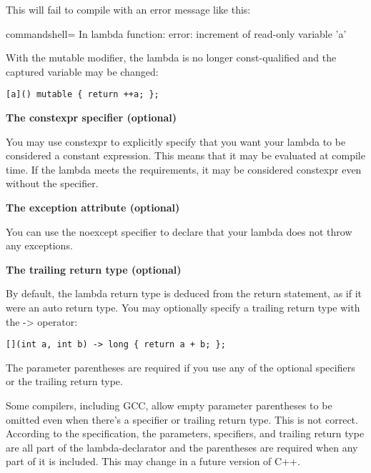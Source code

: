 This will fail to compile with an error message like this:

\begin{tcblisting}{commandshell={}}
In lambda function:
error: increment of read-only variable 'a'
\end{tcblisting}

With the mutable modifier, the lambda is no longer const-qualified and the captured variable may be changed:

\begin{lstlisting}[style=styleCXX]
[a]() mutable { return ++a; };
\end{lstlisting}


\noindent
\textbf{The constexpr specifier (optional)}

You may use constexpr to explicitly specify that you want your lambda to be considered a constant expression. This means that it may be evaluated at compile time. If the lambda meets the requirements, it may be considered constexpr even without the specifier.

\noindent
\textbf{The exception attribute (optional)}

You can use the noexcept specifier to declare that your lambda does not throw any exceptions.

\noindent
\textbf{The trailing return type (optional)}

By default, the lambda return type is deduced from the return statement, as if it were an auto return type. You may optionally specify a trailing return type with the -> operator:

\begin{lstlisting}[style=styleCXX]
[](int a, int b) -> long { return a + b; };
\end{lstlisting}

The parameter parentheses are required if you use any of the optional specifiers or the trailing return type.

\begin{tcolorbox}[colback=webgreen!5!white,colframe=webgreen!75!black,title=Note]
Some compilers, including GCC, allow empty parameter parentheses to be omitted even when there's a specifier or trailing return type. This is not correct. According to the specification, the parameters, specifiers, and trailing return type are all part of the lambda-declarator and the parentheses are required when any part of it is included. This may change in a future version of C++.
\end{tcolorbox}














